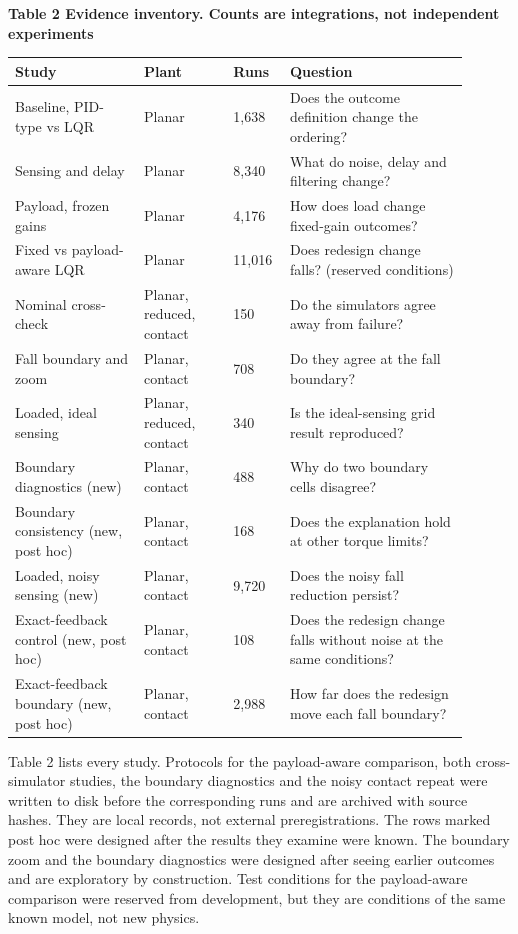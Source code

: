 \documentclass[11pt,a4paper]{article}
\begin{document}
\textbf{Table 2 Evidence inventory. Counts are integrations, not independent experiments}
\begin{longtable}{p{0.261\linewidth}p{0.189\linewidth}p{0.09\linewidth}p{0.36\linewidth}}
\toprule
Study & Plant & Runs & Question \\ \midrule \endhead
Baseline, PID-type vs LQR & Planar & 1,638 & Does the outcome definition change the ordering? \\
Sensing and delay & Planar & 8,340 & What do noise, delay and filtering change? \\
Payload, frozen gains & Planar & 4,176 & How does load change fixed-gain outcomes? \\
Fixed vs payload-aware LQR & Planar & 11,016 & Does redesign change falls? (reserved conditions) \\
Nominal cross-check & Planar, reduced, contact & 150 & Do the simulators agree away from failure? \\
Fall boundary and zoom & Planar, contact & 708 & Do they agree at the fall boundary? \\
Loaded, ideal sensing & Planar, reduced, contact & 340 & Is the ideal-sensing grid result reproduced? \\
Boundary diagnostics (new) & Planar, contact & 488 & Why do two boundary cells disagree? \\
Boundary consistency (new, post hoc) & Planar, contact & 168 & Does the explanation hold at other torque limits? \\
Loaded, noisy sensing (new) & Planar, contact & 9,720 & Does the noisy fall reduction persist? \\
Exact-feedback control (new, post hoc) & Planar, contact & 108 & Does the redesign change falls without noise at the same conditions? \\
Exact-feedback boundary (new, post hoc) & Planar, contact & 2,988 & How far does the redesign move each fall boundary? \\
\bottomrule
\end{longtable}
Table 2 lists every study. Protocols for the payload-aware comparison, both cross-simulator studies, the boundary diagnostics and the noisy contact repeat were written to disk before the corresponding runs and are archived with source hashes. They are local records, not external preregistrations. The rows marked post hoc were designed after the results they examine were known. The boundary zoom and the boundary diagnostics were designed after seeing earlier outcomes and are exploratory by construction. Test conditions for the payload-aware comparison were reserved from development, but they are conditions of the same known model, not new physics.
\end{document}
